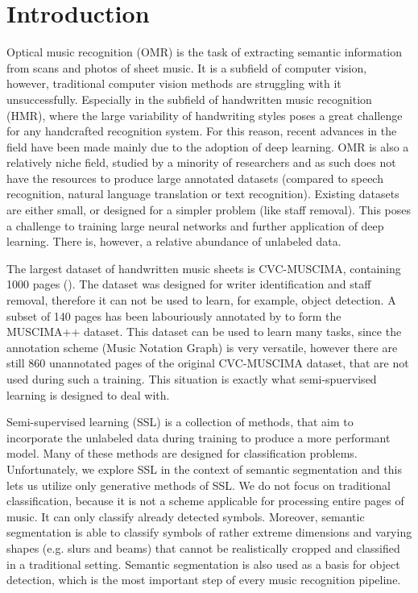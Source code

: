 \chapter{Introduction}
\label{chap:Introduction}

Optical music recognition (OMR) is the task of extracting semantic information from scans and photos of sheet music. It is a subfield of computer vision, however, traditional computer vision methods are struggling with it unsuccessfully. Especially in the subfield of handwritten music recognition (HMR), where the large variability of handwriting styles poses a great challenge for any handcrafted recognition system. For this reason, recent advances in the field have been made mainly due to the adoption of deep learning. OMR is also a relatively niche field, studied by a minority of researchers and as such does not have the resources to produce large annotated datasets (compared to speech recognition, natural language translation or text recognition). Existing datasets are either small, or designed for a simpler problem (like staff removal). This poses a challenge to training large neural networks and further application of deep learning. There is, however, a relative abundance of unlabeled data.

The largest dataset of handwritten music sheets is CVC-MUSCIMA, containing 1000 pages (\cite{CvcMuscima}). The dataset was designed for writer identification and staff removal, therefore it can not be used to learn, for example, object detection. A subset of 140 pages has been labouriously annotated by \cite{MuscimaPP} to form the MUSCIMA++ dataset. This dataset can be used to learn many tasks, since the annotation scheme (Music Notation Graph) is very versatile, however there are still 860 unannotated pages of the original CVC-MUSCIMA dataset, that are not used during such a training. This situation is exactly what semi-spuervised learning is designed to deal with.

Semi-supervised learning (SSL) is a collection of methods, that aim to incorporate the unlabeled data during training to produce a more performant model. Many of these methods are designed for classification problems. Unfortunately, we explore SSL in the context of semantic segmentation and this lets us utilize only generative methods of SSL. We do not focus on traditional classification, because it is not a scheme applicable for processing entire pages of music. It can only classify already detected symbols. Moreover, semantic segmentation is able to classify symbols of rather extreme dimensions and varying shapes (e.g. slurs and beams) that cannot be realistically cropped and classified in a traditional setting. Semantic segmentation is also used as a basis for object detection, which is the most important step of every music recognition pipeline.

